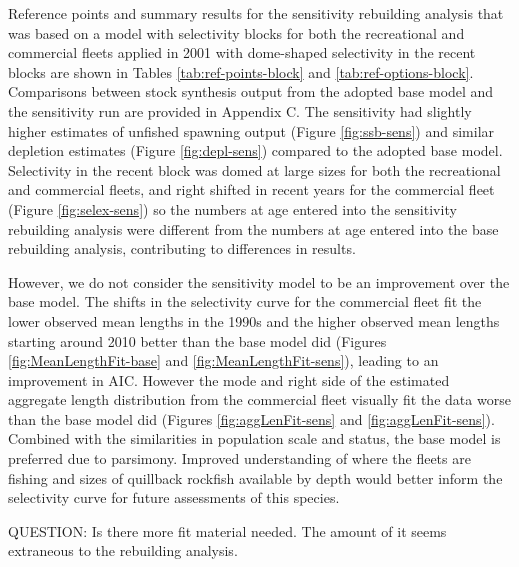 \documentclass[11pt,
  english,
  a4paper,
]{article}
\begin{document}
Reference points and summary results for the sensitivity rebuilding analysis that was based on a model with selectivity blocks for both the recreational and commercial fleets applied in 2001 with dome-shaped selectivity in the recent blocks are shown in Tables \ref{tab:ref-points-block} and \ref{tab:ref-options-block}. Comparisons between stock synthesis output from the adopted base model and the sensitivity run are provided in \protect\hypertarget{append_c}{}{Appendix C}. The sensitivity had slightly higher estimates of unfished spawning output (Figure \ref{fig:ssb-sens}) and similar depletion estimates (Figure \ref{fig:depl-sens}) compared to the adopted base model. Selectivity in the recent block was domed at large sizes for both the recreational and commercial fleets, and right shifted in recent years for the commercial fleet (Figure \ref{fig:selex-sens}) so the numbers at age entered into the sensitivity rebuilding analysis were different from the numbers at age entered into the base rebuilding analysis, contributing to differences in results.

\leavevmode\tagmcend\tagstructend\par


However, we do not consider the sensitivity model to be an improvement over the base model. The shifts in the selectivity curve for the commercial fleet fit the lower observed mean lengths in the 1990s and the higher observed mean lengths starting around 2010 better than the base model did (Figures \ref{fig:MeanLengthFit-base} and \ref{fig:MeanLengthFit-sens}), leading to an improvement in AIC. However the mode and right side of the estimated aggregate length distribution from the commercial fleet visually fit the data worse than the base model did (Figures \ref{fig:aggLenFit-sens} and \ref{fig:aggLenFit-sens}). Combined with the similarities in population scale and status, the base model is preferred due to parsimony. Improved understanding of where the fleets are fishing and sizes of quillback rockfish available by depth would better inform the selectivity curve for future assessments of this species.

\leavevmode\tagmcend\tagstructend\par


QUESTION: Is there more fit material needed. The amount of it seems extraneous to the rebuilding analysis.
\end{document}
